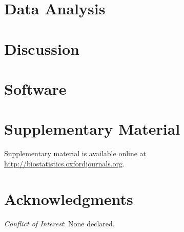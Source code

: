 \documentclass[oupdraft]{bio}
\begin{document}
\section{Data Analysis}

\section{Discussion}

\section{Software}

\section{Supplementary Material}

Supplementary material is available online at
\url{http://biostatistics.oxfordjournals.org}.

\section*{Acknowledgments}

{\it Conflict of Interest}: None declared.




\end{document}

